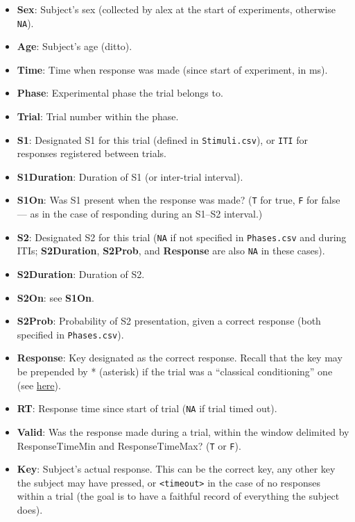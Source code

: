 \documentclass[11pt,]{article}
\begin{document}
\begin{itemize}
\item
  \textbf{Sex}: Subject's sex (collected by alex at the start of
  experiments, otherwise \texttt{NA}).
\item
  \textbf{Age}: Subject's age (ditto).
\item
  \textbf{Time}: Time when response was made (since start of experiment,
  in ms).
\item
  \textbf{Phase}: Experimental phase the trial belongs to.
\item
  \textbf{Trial}: Trial number within the phase.
\item
  \textbf{S1}: Designated S1 for this trial (defined in
  \texttt{Stimuli.csv}), or \texttt{ITI} for responses registered
  between trials.
\item
  \textbf{S1Duration}: Duration of S1 (or inter-trial interval).
\item
  \textbf{S1On}: Was S1 present when the response was made? (\texttt{T}
  for true, \texttt{F} for false --- as in the case of responding during
  an S1--S2 interval.)
\item
  \textbf{S2}: Designated S2 for this trial (\texttt{NA} if not
  specified in \texttt{Phases.csv} and during ITIs; \textbf{S2Duration},
  \textbf{S2Prob}, and \textbf{Response} are also \texttt{NA} in these
  cases).
\item
  \textbf{S2Duration}: Duration of S2.
\item
  \textbf{S2On}: see \textbf{S1On}.
\item
  \textbf{S2Prob}: Probability of S2 presentation, given a correct
  response (both specified in \texttt{Phases.csv}).
\item
  \textbf{Response}: Key designated as the correct response. Recall that
  the key may be prepended by * (asterisk) if the trial was a
  ``classical conditioning'' one (see \hyperref[responses]{here}).
\item
  \textbf{RT}: Response time since start of trial (\texttt{NA} if trial
  timed out).
\item
  \textbf{Valid}: Was the response made during a trial, within the
  window delimited by ResponseTimeMin and ResponseTimeMax? (\texttt{T}
  or \texttt{F}).
\item
  \textbf{Key}: Subject's actual response. This can be the correct key,
  any other key the subject may have pressed, or
  \texttt{\textless{}timeout\textgreater{}} in the case of no responses
  within a trial (the goal is to have a faithful record of everything
  the subject does).
\end{itemize}
\end{document}
